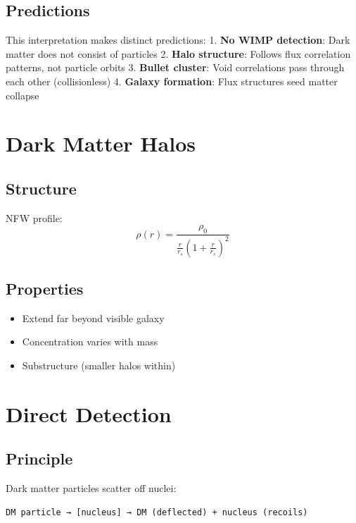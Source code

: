 \documentclass[
  11pt,
  letterpaper,
  twoside,
  openright]{book}
\providecommand{\tightlist}{%
  \setlength{\itemsep}{0pt}\setlength{\parskip}{0pt}}
\begin{document}
\subsection{Predictions}\label{predictions}

This interpretation makes distinct predictions: 1. \textbf{No WIMP
detection}: Dark matter does not consist of particles 2. \textbf{Halo
structure}: Follows flux correlation patterns, not particle orbits 3.
\textbf{Bullet cluster}: Void correlations pass through each other
(collisionless) 4. \textbf{Galaxy formation}: Flux structures seed
matter collapse

\section{Dark Matter Halos}\label{dark-matter-halos}

\subsection{Structure}\label{structure-4}

NFW profile: \[
\rho(r) = \frac{\rho_0}{\frac{r}{r_s}\left(1 + \frac{r}{r_s}\right)^2}
\]

\subsection{Properties}\label{properties-16}

\begin{itemize}
\tightlist
\item
  Extend far beyond visible galaxy
\item
  Concentration varies with mass
\item
  Substructure (smaller halos within)
\end{itemize}

\section{Direct Detection}\label{direct-detection}

\subsection{Principle}\label{principle}

Dark matter particles scatter off nuclei:

\begin{verbatim}
DM particle → [nucleus] → DM (deflected) + nucleus (recoils)
\end{verbatim}
\end{document}
